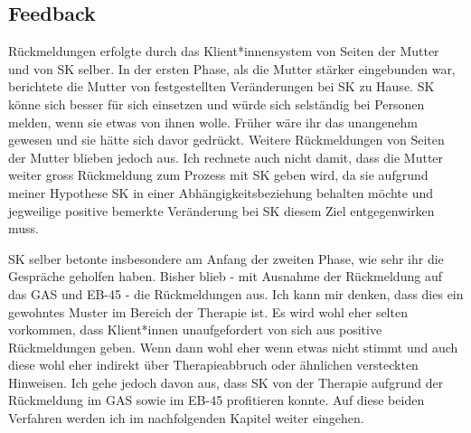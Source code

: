 \subsection{Feedback} 
Rückmeldungen erfolgte durch das Klient*innensystem von Seiten der Mutter und von SK selber. In der ersten Phase, als die Mutter stärker eingebunden war, berichtete die Mutter von festgestellten Veränderungen bei SK zu Hause. SK könne sich besser für sich einsetzen und würde sich selständig bei Personen melden, wenn sie etwas von ihnen wolle. Früher wäre ihr das unangenehm gewesen und sie hätte sich davor gedrückt. Weitere Rückmeldungen von Seiten der Mutter blieben jedoch aus. Ich rechnete auch nicht damit, dass die Mutter weiter gross Rückmeldung zum Prozess mit SK geben wird, da sie aufgrund meiner Hypothese SK in einer Abhängigkeitsbeziehung behalten möchte und jegweilige positive bemerkte Veränderung bei SK diesem Ziel entgegenwirken muss.

SK selber betonte insbesondere am Anfang der zweiten Phase, wie sehr ihr die Gespräche geholfen haben. Bisher blieb - mit Ausnahme der Rückmeldung auf das GAS und EB-45 - die Rückmeldungen aus. Ich kann mir denken, dass dies ein gewohntes Muster im Bereich der Therapie ist. Es wird wohl eher selten vorkommen, dass Klient*innen unaufgefordert von sich aus positive Rückmeldungen geben. Wenn dann wohl eher wenn etwas nicht stimmt und auch diese wohl eher indirekt über Therapieabbruch oder ähnlichen versteckten Hinweisen. Ich gehe jedoch davon aus, dass SK von der Therapie aufgrund der Rückmeldung im GAS sowie im EB-45 profitieren konnte. Auf diese beiden Verfahren werden ich im nachfolgenden Kapitel  weiter eingehen.